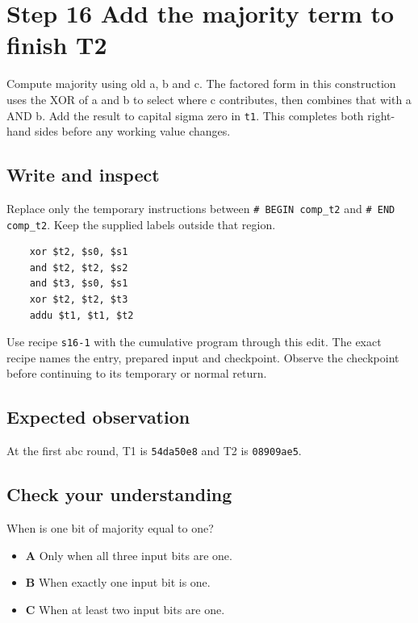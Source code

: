\section{Step 16 Add the majority term to finish T2}\label{sha-s16}

Compute majority using old a, b and c. The factored form in this construction uses the XOR of a and b to select where c contributes, then combines that with a AND b. Add the result to capital sigma zero in \texttt{t1}. This completes both right-hand sides before any working value changes.

\subsection{Write and inspect}
Replace only the temporary instructions between \texttt{\# BEGIN comp\_t2} and \texttt{\# END comp\_t2}. Keep the supplied labels outside that region.

\begin{verbatim}
    xor $t2, $s0, $s1
    and $t2, $t2, $s2
    and $t3, $s0, $s1
    xor $t2, $t2, $t3
    addu $t1, $t1, $t2
\end{verbatim}

Use recipe \texttt{s16-1} with the cumulative program through this edit. The exact recipe names the entry, prepared input and checkpoint. Observe the checkpoint before continuing to its temporary or normal return.

\subsection{Expected observation}
At the first abc round, T1 is \texttt{54da50e8} and T2 is \texttt{08909ae5}.

\subsection{Check your understanding}
When is one bit of majority equal to one?

\begin{itemize}
  \item \textbf{A} Only when all three input bits are one.
  \item \textbf{B} When exactly one input bit is one.
  \item \textbf{C} When at least two input bits are one.
\end{itemize}
